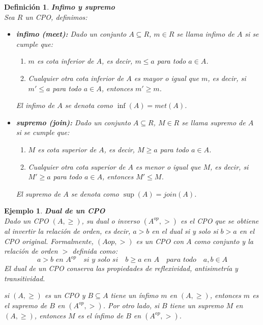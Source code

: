\documentclass[executivepaper]{article}
\newtheorem{defi}[propo]{Definición}
\newtheorem{ejemplo}[propo]{Ejemplo}
\begin{document}
\begin{defi}\textbf{Infimo y supremo}\\
    Sea $R$ un CPO, definimos:
\begin{itemize}
    \item \textbf{infimo (meet):} Dado un conjunto $A \subseteq R$, $m \in R$ se llama infimo de $A$ si se cumple que:
    \begin{enumerate}
        \item $m$ es cota inferior de $A$, es decir, $m \leq a$ para todo $a \in A$.
        \item Cualquier otra cota inferior de $A$ es mayor o igual que $m$, es decir, si $m' \leq a$ para todo $a \in A$, entonces $m' \geq m$.
    \end{enumerate}
    El infimo de $A$ se denota como $\inf(A)=met(A)$.
    \item \textbf{supremo (join):}  Dado un conjunto $A \subseteq R$, $M \in R$ se llama supremo de $A$ si se cumple que:
    \begin{enumerate}
        \item $M$ es cota superior de $A$, es decir, $M \geq a$ para todo $a \in A$.
        \item Cualquier otra cota superior de $A$ es menor o igual que $M$, es decir, si $M' \geq a$ para todo $a \in A$, entonces $M' \leq M$.
    \end{enumerate}
    El supremo de $A$ se denota como $\sup(A)=join(A)$.
\end{itemize}    
\end{defi}

\begin{ejemplo}\textbf{Dual de un CPO}\\
    Dado un CPO $(A,\geq)$, su dual o inverso $(A^{op},>)$ es el CPO que se obtiene al invertir la relación de orden, es decir, $a>b$ en el dual si y solo si $b>a$ en el CPO original. Formalmente, $(A{op},>)$ es un CPO con $A$ como conjunto y la relación de orden $>$ definida como:
    $$a > b \,\,en\,\,A^{op} \quad si\,\, y\,\, solo\,\, si \quad b \geq a\,\,en\,\,A \quad para\,\, todo \quad a,b \in A$$
    El dual de un CPO conserva las propiedades de reflexividad, antisimetría y transitividad.

    si $(A, \geq)$ es un CPO y $B \subseteq A$ tiene un ínfimo $m$ en $(A, \geq)$, entonces $m$ es el supremo de $B$ en $(A^{op}, >)$. Por otro lado, si $B$ tiene un supremo $M$ en $(A, \geq)$, entonces $M$ es el ínfimo de $B$ en $(A^{op}, >)$.
\end{ejemplo}
\end{document}
